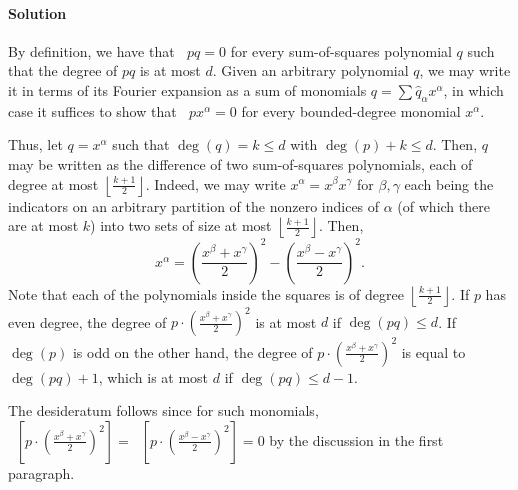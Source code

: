 \documentclass[11pt]{article}
\theoremstyle{definition}
\DeclareMathOperator{\pE}{\widetilde{\mathbb{E}}} %
\begin{document}
\paragraph{Solution}

By definition, we have that $\pE pq = 0$ for every sum-of-squares polynomial $q$ such that the degree of $pq$ is at most $d$. Given an arbitrary polynomial $q$, we may write it in terms of its Fourier expansion as a sum of monomials $q = \sum \widehat{q}_\alpha x^\alpha$, in which case it suffices to show that $\pE p x^\alpha = 0$ for every bounded-degree monomial $x^\alpha$.

Thus, let $q = x^\alpha$ such that $\deg(q) = k \le d$ with $\deg (p)+k \le d$. Then, $q$ may be written as the difference of two sum-of-squares polynomials, each of degree at most $\left\lfloor \frac{k+1}{2}\right\rfloor$. Indeed, we may write $x^\alpha = x^\beta x^\gamma$ for $\beta,\gamma$ each being the indicators on an arbitrary partition of the nonzero indices of $\alpha$ (of which there are at most $k$) into two sets of size at most $\left\lfloor \frac{k+1}{2}\right\rfloor$. Then,
\[ x^\alpha = \left( \frac{x^\beta + x^\gamma}{2} \right)^2 - \left( \frac{x^\beta - x^\gamma}{2} \right)^2. \]
Note that each of the polynomials inside the squares is of degree $\left \lfloor \frac{k+1}{2} \right \rfloor$. If $p$ has even degree, the degree of $p \cdot \left( \frac{x^\beta + x^\gamma}{2} \right)^2$ is at most $d$ if $\deg (pq) \le d$. If $\deg(p)$ is odd on the other hand, the degree of $p \cdot \left( \frac{x^\beta + x^\gamma}{2} \right)^2$ is equal to $\deg(pq) + 1$, which is at most $d$ if $\deg(p q) \le d-1$.

The desideratum follows since for such monomials, $\pE \left[ p \cdot \left( \frac{x^\beta+x^\gamma}{2} \right)^2 \right] = \pE \left[ p \cdot \left( \frac{x^\beta-x^\gamma}{2} \right)^2 \right] = 0$ by the discussion in the first paragraph.



\end{document}
